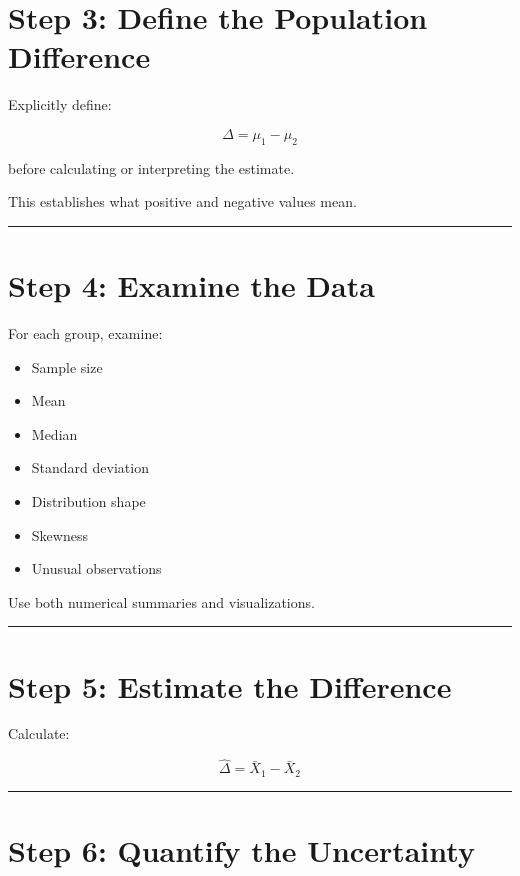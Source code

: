 \documentclass[
  letterpaper,
  DIV=11,
  numbers=noendperiod]{scrreprt}
\providecommand{\tightlist}{%
  \setlength{\itemsep}{0pt}\setlength{\parskip}{0pt}}
\begin{document}
\section{Step 3: Define the Population
Difference}\label{step-3-define-the-population-difference}

Explicitly define:

\[
\Delta=\mu_1-\mu_2
\]

before calculating or interpreting the estimate.

This establishes what positive and negative values mean.

\begin{center}\rule{0.5\linewidth}{0.5pt}\end{center}

\section{Step 4: Examine the Data}\label{step-4-examine-the-data}

For each group, examine:

\begin{itemize}
\tightlist
\item
  Sample size
\item
  Mean
\item
  Median
\item
  Standard deviation
\item
  Distribution shape
\item
  Skewness
\item
  Unusual observations
\end{itemize}

Use both numerical summaries and visualizations.

\begin{center}\rule{0.5\linewidth}{0.5pt}\end{center}

\section{Step 5: Estimate the
Difference}\label{step-5-estimate-the-difference}

Calculate:

\[
\hat{\Delta}
=
\bar{X}_1-\bar{X}_2
\]

\begin{center}\rule{0.5\linewidth}{0.5pt}\end{center}

\section{Step 6: Quantify the
Uncertainty}\label{step-6-quantify-the-uncertainty}
\end{document}
